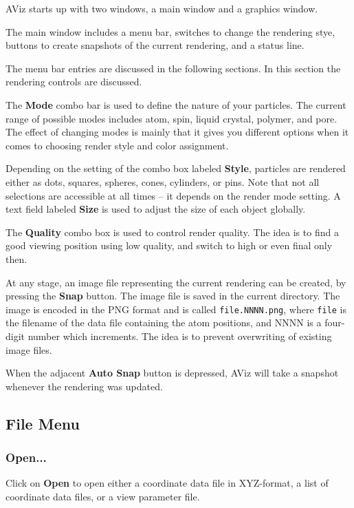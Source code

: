\documentclass[11pt]{article}
\begin{document}
AViz starts up with two windows, a main window and a graphics window.

The main window includes a menu bar, switches to change the rendering 
stye, buttons to create snapshots of the current rendering, and a status 
line.

The menu bar entries are discussed in the following sections.  In this section
the rendering controls are discussed.

The {\bf Mode} combo bar is used to define the nature of your particles.  
The current range of possible modes includes atom, spin, liquid crystal, 
polymer, and pore.  The effect of changing modes is mainly that it gives
you different options when it comes to choosing render style and color 
assignment.

Depending on the setting of the combo box labeled {\bf Style}, particles are
rendered either as dots, squares, spheres, cones, cylinders, or pins.  Note
that not all selections are accessible at all times -- it depends on the render
mode setting.  A text field labeled {\bf Size} is used to adjust the size of
each object globally.   

The {\bf Quality} combo box is used to control render quality.  The idea is to
find a good viewing position using low quality, and switch to high or even
final only then. 

At any stage, an image file representing the current rendering can be created,
by pressing the {\bf Snap} button.  The image file is saved in the current
directory.  The image is encoded in the PNG format and
is called {\tt file.NNNN.png}, where {\tt file} is the filename of the data file
containing the atom positions, and NNNN is a four-digit number which 
increments.  The idea is to prevent overwriting of existing image files.

When the adjacent {\bf Auto Snap} button is depressed, AViz will take a
snapshot whenever the rendering was updated. 

\subsection{File Menu}

\subsubsection{Open...}
\label{fileOpen}
Click on {\bf Open} to open either a coordinate data file in XYZ-format, a list
of coordinate data files,  or a view parameter file.   
\end{document}
